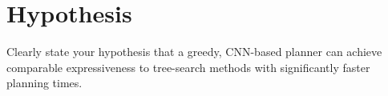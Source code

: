 \section{Hypothesis}

\begin{outline}
  Clearly state your hypothesis that a greedy, CNN-based planner can achieve comparable expressiveness to tree-search methods with significantly faster planning times.
\end{outline}
